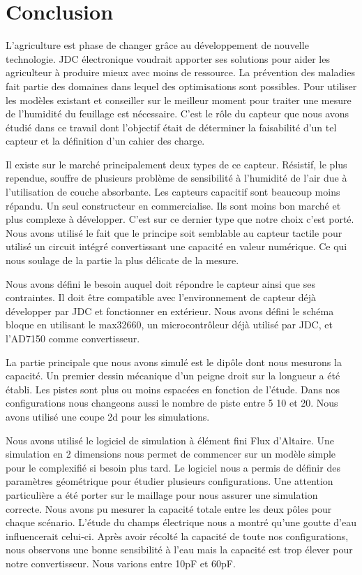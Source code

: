 \section{Conclusion}

L'agriculture est phase de changer grâce au développement de nouvelle technologie. JDC électronique voudrait apporter ses solutions pour aider les agriculteur à produire mieux avec moins de ressource. La prévention des maladies fait partie des domaines dans lequel des optimisations sont possibles. Pour utiliser les modèles existant et conseiller sur le meilleur moment pour traiter une mesure de l'humidité du feuillage est nécessaire. C'est le rôle du capteur que nous avons étudié dans ce travail dont l'objectif était de déterminer la faisabilité d'un tel capteur et la définition d'un cahier des charge.

Il existe sur le marché principalement deux types de ce capteur. Résistif, le plus rependue, souffre de plusieurs problème de sensibilité à l'humidité de l'air due à l'utilisation de couche absorbante. Les capteurs capacitif sont beaucoup moins répandu. Un seul constructeur en commercialise. Ils sont moins bon marché et plus complexe à développer. C'est sur ce dernier type que notre choix c'est porté. Nous avons  utilisé le fait que le principe soit semblable au capteur tactile pour utilisé un circuit intégré convertissant une capacité en valeur numérique. Ce qui nous soulage de la partie la plus délicate de la mesure.

Nous avons défini le besoin auquel doit répondre le capteur ainsi que ses contraintes. Il doit être compatible avec l’environnement de capteur déjà développer par JDC et fonctionner en extérieur. Nous avons défini le schéma bloque en utilisant le max32660, un microcontrôleur déjà utilisé par JDC, et l'AD7150 comme convertisseur.

La partie principale que nous avons simulé est le dipôle dont nous mesurons la capacité. Un premier dessin mécanique d'un peigne droit sur la longueur a été établi. Les pistes sont plus ou moins espacées en fonction de l'étude. Dans nos configurations nous changeons aussi le nombre de piste entre 5 10 et 20. Nous avons utilisé une coupe 2d pour les simulations.

Nous avons utilisé le logiciel de simulation à élément fini Flux d'Altaire. Une simulation en 2 dimensions nous permet de commencer sur un modèle simple pour le complexifié si besoin plus tard. Le logiciel nous a permis de définir des paramètres géométrique pour étudier plusieurs configurations. Une attention particulière a été porter sur le maillage pour nous assurer une simulation correcte. Nous avons pu mesurer la capacité totale entre les deux pôles pour chaque scénario. L'étude du champs électrique nous a montré qu'une goutte d'eau influencerait celui-ci. Après avoir récolté la capacité de toute nos configurations, nous observons une bonne sensibilité à l'eau mais la capacité est trop élever pour notre convertisseur. Nous varions entre 10pF et 60pF.

